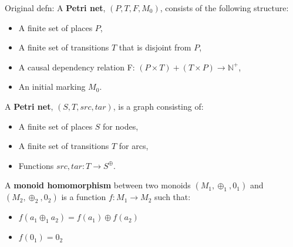 \begin{definition}
  \label{def:Original-Petri-Net}
  Original defn: A \textbf{Petri net}, $(P, T, F, M_0)$, consists of the following structure:  
  \begin{itemize}
  \item A finite set of places $P$,
  \item A finite set of transitions $T$ that is disjoint from $P$,
  \item A causal dependency relation F: $(P \times T) + (T \times P) \to \mathbb{N}^+ $, 
  \item An initial marking $M_0$.
  \end{itemize}
\end{definition}
%
\begin{definition}
  \label{def:Petri-Net}
  A \textbf{Petri net}, $(S, T, src, tar)$, is a graph consisting of:  
  \begin{itemize}
  \item A finite set of places $S$ for nodes,
  \item A finite set of transitions $T$ for arcs,
  \item Functions $src, tar: T\to S^\oplus$.
  \end{itemize}
\end{definition}
%
%
\begin{definition}
  \label{Monoid-Homomorphism}
  A \textbf{monoid homomorphism} between two monoids $(M_1, \oplus_1, 0_1)$ and $(M_2, \oplus_2, 0_2)$
  is a function $f: M_1 \to M_2$ such that:
  \begin{itemize}
  \item $f(a_1 \oplus_1 a_2) = f(a_1) \oplus f(a_2)$
  \item $f (0_1) = 0_2$
  \end{itemize}
\end{definition}

